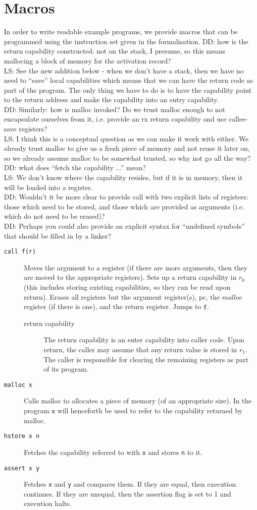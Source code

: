 \documentclass[a4paper]{article}
\newcommand\lau[1]{{\color{purple} \sf \footnotesize {LS: #1}}\\}
\newcommand\dominique[1]{{\color{purple} \sf \footnotesize {DD: #1}}\\}
\newcommand{\pcreg}{\mathrm{pc}}
\newcommand{\codelabel}[1]{\mathit{#1}}
\newcommand{\malloc}{\codelabel{malloc}}
\begin{document}
\section{Macros}
In order to write readable example programs, we provide macros that can be programmed using the instruction set given in the formalisation.
\dominique{how is the return capability constructed: not on the stack, I presume, so this means mallocing a block of memory for the activation record?}
\lau{See the new addition below - when we don't have a stack, then we have no need to ``save'' local capabilities which means that we can have the return code as part of the program. The only thing we have to do is to have the capability point to the return address and make the capability into an entry capability. }
\dominique{Similarly: how is malloc invoked?  Do we trust malloc enough to not encapsulate ourselves from it, i.e. provide an rx return capability and use callee-save registers?}
\lau{ I think this is a conceptual question as we can make it work with either. We already trust malloc to give us a fresh piece of memory and not reuse it later on, so we already assume malloc to be somewhat trusted, so why not go all the way? }
\dominique{what does ``fetch the capability ...'' mean?}
\lau{ We don't know where the capability resides, but if it is in memory, then it will be loaded into a register. }
\dominique{Wouldn't it be more clear to provide call with two explicit lists of registers: those which need to be stored, and those which are provided as arguments (i.e. which do not need to be erased)?}
\dominique{Perhaps you could also provide an explicit syntax for ``undefined symbols'' that should be filled in by a linker?}
\begin{description}
\item[\texttt{call f(r)}] Moves the argument to a register (if there are more arguments, then they are moved to the appropriate registers). Sets up a return capability in $r_0$ (this includes storing existing capabilities, so they can be read upon return). Erases all registers but the argument register(s), $\pcreg$, the $\malloc$ register (if there is one), and the return register. Jumps to $\texttt{f}$.
  \begin{description}
  \item[return capability] The return capability is an enter capability into caller code. Upon return, the caller may assume that any return value is stored in $r_1$. The caller is responsible for clearing the remaining registers as part of its program.  
  \end{description}
\item[\texttt{malloc x}] Calls malloc to allocates a piece of memory (of an appropriate size). In the program $\texttt{x}$ will henceforth be used to refer to the capability returned by malloc.
\item[\texttt{hstore x n}] Fetches the capability referred to with \texttt{x} and stores \texttt{n} to it.
\item[\texttt{assert x y}] Fetches \texttt{x} and \texttt{y} and compares them. If they are equal, then execution continues. If they are unequal, then the assertion flag is set to 1 and execution halts.
\end{description}
\end{document}
